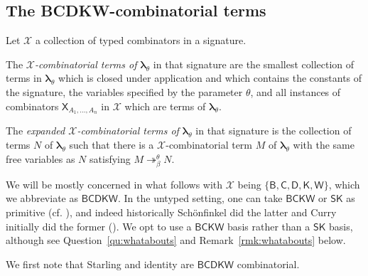 \documentclass{lmcs} %
\newcommand{\param}{\theta}
\newcommand{\mltup}{\boldsymbol\lambda_{\param}}
\newcommand{\transreduces}[2]{\twoheadrightarrow_{#1}^{#2}}
\begin{document}
\subsection{The BCDKW-combinatorial terms}\label{sec:combo:bcdkw}

\begin{defi}
Let $\mathcal{X}$ a collection of typed combinators in a signature. 

The \emph{$\mathcal{X}$-combinatorial terms of} $\mltup$ in that signature are the smallest collection of terms in $\mltup$ which is closed under application and which contains the constants of the signature, the variables specified by the parameter $\param$, and all instances of combinators $\mathsf{X}_{A_1, \ldots, A_n}$ in $\mathcal{X}$ which are terms of $\mltup$.

The \emph{expanded $\mathcal{X}$-combinatorial terms of} $\mltup$ in that signature is the collection of terms $N$ of $\mltup$ such that there is a $\mathcal{X}$-combinatorial term $M$ of $\mltup$ with the same free variables as $N$ satisfying $M\transreduces{\beta}{\param} N$.
\end{defi}

We will be mostly concerned in what follows with $\mathcal{X}$ being $\{\mathsf{B}, \mathsf{C}, \mathsf{D}, \mathsf{K}, \mathsf{W}\}$, which we abbreviate as $\mathsf{BCDKW}$. In the untyped setting, one can take $\mathsf{BCKW}$ or $\mathsf{SK}$ as primitive (cf. \cite[Lemma 1.3.9 p. 17]{Bimbo2011-me}), and indeed historically Sch\"onfinkel did the latter and Curry initially did the former (\cite[\S{2.2}]{Seldin2009-kc}). We opt to use a $\mathsf{BCKW}$ basis rather than a $\mathsf{SK}$ basis, although see Question~\ref{qu:whatabouts} and Remark~\ref{rmk:whatabouts} below.

We first note that Starling and identity are $\mathsf{BCDKW}$ combinatorial.
\end{document}
